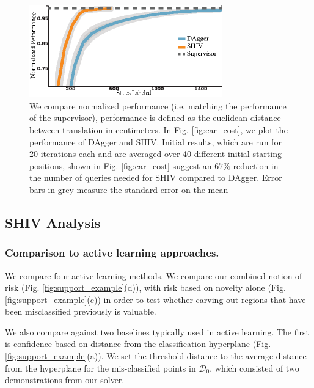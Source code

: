 \documentclass[10pt, conference]{ieeeconf}      %
\begin{document}
\begin{figure}[t!]
\centering
\includegraphics[width=\columnwidth, height=4cm]{figures/needle_insertion_results.eps}
\caption{We compare normalized performance (i.e. matching the performance of the supervisor), performance is defined as the euclidean distance between translation in centimeters. In Fig. \ref{fig:car_cost}, we plot the performance of DAgger and SHIV.  Initial results, which are run for 20 iterations each and are averaged over 40 different initial starting positions, shown in Fig. \ref{fig:car_cost} suggest an $67\%$ reduction in the number of queries needed for SHIV compared to DAgger. Error bars in grey measure the standard error on the mean}
\vspace*{-10pt}
\label{fig:needle}
\end{figure}


\subsection{SHIV Analysis}\label{sec:car}



\subsubsection{Comparison to active learning approaches.}

 We compare four active learning methods. We compare our combined notion of risk (Fig. \ref{fig:support_example}(d)), with risk based on novelty alone (Fig. \ref{fig:support_example}(c)) in order to test whether carving out regions that have been misclassified previously is valuable. 

We also compare against two baselines typically used in active learning. The first is confidence based on distance from the classification hyperplane \cite{tong2002support} (Fig. \ref{fig:support_example}(a)). We set the threshold distance to the average distance from the hyperplane for the mis-classified points in $\mathcal{D}_0$, which consisted of two demonstrations from our solver. 
\end{document}
